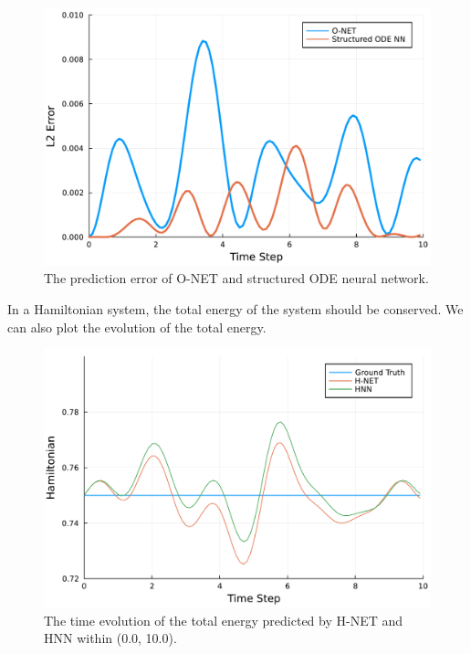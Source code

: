 \documentclass[
	parskip, 			   %
	twoside, 			   %
	DIV=14, 			   %
	BCOR=15.0mm, 		   %
	headsepline, 		   %
	open=right, 		   %
	captions=tableheading, %
	bibliography=totoc,    %
	numbers=noenddot       %
]{scrreprt}
\begin{document}
\clearpage
\begin{figure}[h!]
    \centering
    \includegraphics[scale=0.5]{figures/prediction_error_O_NET_and_structured_ODE_NN.pdf}
    \caption{The prediction error of O-NET and structured ODE neural network.}
    \label{fig:prediction_error_O_NET_and_structured_ODE_NN}
\end{figure}

In a Hamiltonian system, the total energy of the system should be conserved. We can also plot the evolution of the total energy.

\begin{figure}[h!]
    \centering
    \includegraphics[scale=0.5]{figures/Hamiltonian_evolution_H_NET_and_HNN.pdf}
    \caption{The time evolution of the total energy predicted by H-NET and HNN within (0.0, 10.0).}
    \label{fig:Hamiltonian_evolution_H_NET_and_HNN}
\end{figure}
\end{document}
